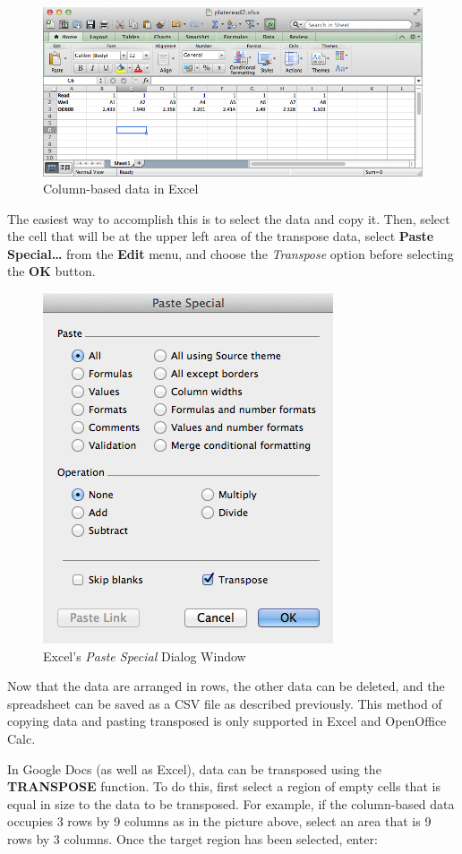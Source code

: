 \begin{figure}[htbp]
\centering
\includegraphics[width=0.80\columnwidth]{../csv/doc/figures/excel-horizdata.png}
\caption{Column-based data in Excel}
\end{figure}

The easiest way to accomplish this is to select the data and copy it.
Then, select the cell that will be at the upper left area of the
transpose data, select \textbf{Paste Special\ldots{}} from the
\textbf{Edit} menu, and choose the \emph{Transpose} option before
selecting the \textbf{OK} button.

\begin{figure}[htbp]
\centering
\includegraphics[width=0.50\columnwidth]{../csv/doc/figures/excel-paste_special.png}
\caption{Excel's \textit{Paste Special} Dialog Window}
\end{figure}

Now that the data are arranged in rows, the other data can be deleted,
and the spreadsheet can be saved as a CSV file as described previously.
This method of copying data and pasting transposed is only supported in
Excel and OpenOffice Calc.

In Google Docs (as well as Excel), data can be transposed using the
\textbf{TRANSPOSE} function. To do this, first select a region of empty
cells that is equal in size to the data to be transposed. For example,
if the column-based data occupies 3 rows by 9 columns as in the picture
above, select an area that is 9 rows by 3 columns. Once the target
region has been selected, enter:

